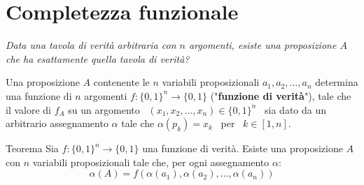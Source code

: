 \documentclass[a4paper,11pt]{report}
\begin{document}
\section{Completezza funzionale}
\textit{Data una tavola di verità arbitraria con \( n \) argomenti, esiste una proposizione \( A \) che ha esattamente quella tavola di verità?}

Una proposizione \( A \) contenente le \( n \) variabili proposizionali \( a_1, a_2, \dots, a_n \) determina una funzione di \( n \) argomenti \( f: \{0, 1\}^n \to \{0,1\} \) ("\textbf{funzione di verità}"), tale che il valore di \( f_A \) su un argomento \ \( (x_1, x_2, \dots, x_n) \in \{0,1\}^n\) \ sia dato da un arbitrario assegnamento \( \alpha \) tale che \( \alpha(p_k) = x_k\) \ per \ \(k \in [1,n] \).

\begin{thmbox}{Teorema}{}
    Sia \( f: \{0, 1\}^n \to \{0,1\} \) una funzione di verità. Esiste una proposizione \( A \) con \( n \) variabili proposizionali tale che, per ogni assegnamento \( \alpha \):
    \[ \alpha(A) = f(\alpha(a_1), \alpha(a_2), \dots, \alpha(a_n)) \]
\end{thmbox}
\end{document}
